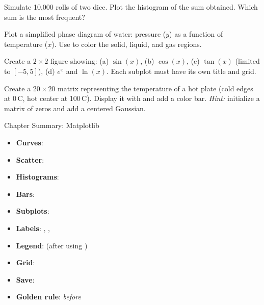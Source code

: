 \begin{exercise}
Simulate 10,000 rolls of two dice. Plot the histogram of the sum obtained.
Which sum is the most frequent?
\end{exercise}

\begin{exercise}
Plot a simplified phase diagram of water: pressure ($y$) as a function of
temperature ($x$). Use  to color the solid,
liquid, and gas regions.
\end{exercise}

\begin{exercise}
Create a $2\times 2$ figure showing: (a) $\sin(x)$, (b) $\cos(x)$,
(c) $\tan(x)$ (limited to $[-5, 5]$), (d) $e^x$ and $\ln(x)$.
Each subplot must have its own title and grid.
\end{exercise}

\begin{exercise}
Create a $20\times 20$ matrix representing the temperature of a
hot plate (cold edges at 0\,\textdegree C, hot center at 100\,\textdegree C).
Display it with  and add a color bar.
\emph{Hint:} initialize a matrix of zeros and add a centered Gaussian.
\end{exercise}

\begin{keyformulas}{Chapter Summary: Matplotlib}
\begin{itemize}
    \item \textbf{Curves}: 
    \item \textbf{Scatter}: 
    \item \textbf{Histograms}: 
    \item \textbf{Bars}: 
    \item \textbf{Subplots}: 
    \item \textbf{Labels}: , , 
    \item \textbf{Legend}:  (after using )
    \item \textbf{Grid}: 
    \item \textbf{Save}: 
    \item \textbf{Golden rule}:  \emph{before} 
\end{itemize}
\end{keyformulas}
